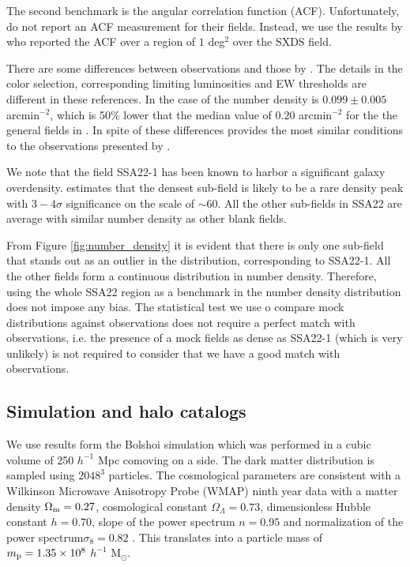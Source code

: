 \documentclass{emulateapj}
\newcommand{\hMpc}{{\ifmmode{h^{-1}{\rm Mpc}}\else{$h^{-1}$Mpc }\fi}}
\begin{document}
The second benchmark is the angular correlation function
(ACF). Unfortunately, \cite{Yamada2012} do  not report an ACF measurement for
their fields. Instead, we use the results by   \cite{Ouchi2008} who
reported the ACF  over a region of $1$ deg$^2$ over the SXDS
field.  

There are some differences between \cite{Ouchi2008} observations
and those by \cite{Yamada2012}. The details in the color selection,
corresponding limiting luminosities and EW thresholds are different
in these references. In the case of
\cite{Ouchi2008} the number density is $0.099\pm0.005$ arcmin$^{-2}$, which
is 50\% lower that the median value of $0.20$ arcmin$^{-2}$ for the
the general fields in \cite{Yamada2012}. In spite of these
differences \cite{Ouchi2008} provides the most similar conditions
to the observations presented by \cite{Yamada2012}.


We note that the field SSA22-1 has been known to harbor a significant
galaxy overdensity. \cite{Yamada2012} estimates that the densest
sub-field is likely to be a rare density peak with $3-4\sigma$
significance on the scale of $\sim 60$\hMpc.  All the other sub-fields
in SSA22 are average with similar number density as other blank fields. 

From Figure \ref{fig:number_density}  it is evident that there is only
one sub-field  that stands out as an outlier in the distribution,
corresponding to SSA22-1. All the other fields form a continuous
distribution in number density. Therefore, using the whole SSA22
region as a benchmark in the number density distribution does not
impose any bias. The statistical test we use o compare mock
distributions against observations does not require a perfect match
with observations, i.e. the presence of a mock fields as dense as
SSA22-1 (which is very unlikely) is not required to consider that we
have a good match with observations.

\subsection{Simulation and halo catalogs}

We use results form the Bolshoi simulation \citep{Bolshoi} which
was performed in a cubic volume of 250 $h^{-1}$ Mpc comoving on a side. The
dark matter distribution is sampled using $2048^{3}$ particles. The
cosmological parameters are consistent with a Wilkinson Microwave
Anisotropy Probe (WMAP) ninth year data with a matter density
$\Omega_{\rm m} = 0.27$, cosmological constant
$\Omega_{\Lambda}=0.73$, dimensionless Hubble constant $h=0.70$, slope
of the power spectrum $n=0.95$ and normalization of the power
spectrum$\sigma_{8}=0.82$ \citep{hinshaw_etal13}.   This
translates into a particle mass of $m_{\rm p}=1.35\times 10^{8}$
$h^{-1}$ M$_{\odot}$.  
\end{document}
